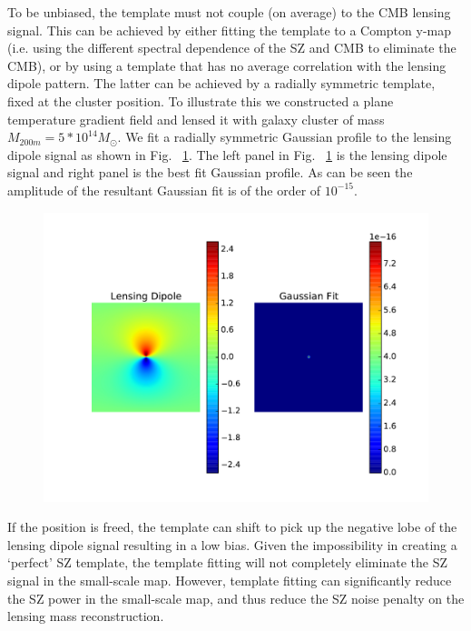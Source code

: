 {To be unbiased, the template must not couple (on average) to the  CMB lensing signal. 
This can be achieved by either fitting the template to a Compton  y-map (i.e. using the different spectral dependence of the SZ and CMB to eliminate the CMB), or by using a template that has no average correlation with the lensing dipole pattern. 
The latter can be achieved by a radially symmetric template, fixed at the cluster position.
To illustrate this we constructed a plane temperature gradient field and lensed it with galaxy cluster of mass $M_{200m} = 5*10^{14}M_{\odot}$. 
We fit a radially symmetric Gaussian profile to the lensing dipole signal as shown in Fig. ~\ref{fig:no_bias}. 
 The left panel in Fig. ~\ref{fig:no_bias} is the lensing dipole signal and right panel is the best fit Gaussian profile. 
 As can be seen the amplitude of the resultant Gaussian fit is of the order of $10^{-15}$.

\begin{figure}
\includegraphics[width=\linewidth]{figs/template_fitting_bias.pdf}
 \caption{
 } 
\label{fig:no_bias}
\end{figure}

If the position is freed, the template can shift to pick up the negative lobe of the lensing dipole signal resulting in a low bias. 
Given the impossibility in creating a `perfect' SZ template, the template fitting will not completely eliminate the SZ signal in the small-scale map. 
However, template fitting can significantly reduce the SZ power in the small-scale map, and thus reduce the SZ noise penalty on the lensing mass reconstruction. 

}
